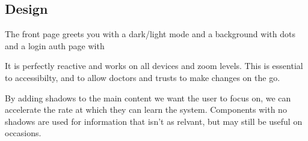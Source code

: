 \subsection{Design}
The front page greets you with a dark/light mode and a background with dots and a login auth page with

It is perfectly reactive and works on all devices and zoom levels. This is essential to accessibilty, and to allow doctors and trusts to make changes on the go.

By adding shadows to the main content we want the user to focus on, we can accelerate the rate at which they can learn the system. Components with no shadows are used for information that isn't as relvant, but may still be useful on occasions.